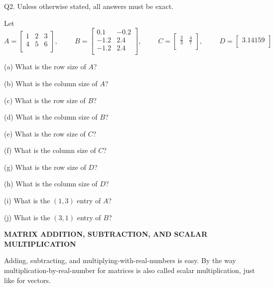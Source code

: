 \newpage

Q2. Unless otherwise stated, all answers must be exact.

Let
\[
A
= 
\begin{bmatrix}
1 & 2 & 3 \\
4 & 5 & 6 \\
\end{bmatrix}
, 
\hspace{1cm}
B
= 
\begin{bmatrix}
0.1 & -0.2 \\
-1.2 & 2.4 \\
-1.2 & 2.4 \\
\end{bmatrix}
, 
\hspace{1cm}
C
= 
\begin{bmatrix}
\frac{2}{3} & \frac{4}{7} \\
\end{bmatrix}
, 
\hspace{1cm}
D
= 
\begin{bmatrix}
3.14159 \\
\end{bmatrix}
\]

(a) What is the row size of $A$?

(b) What is the column size of $A$?

(c) What is the row size of $B$?

(d) What is the column size of $B$?

(e) What is the row size of $C$?

(f) What is the column size of $C$?

(g) What is the row size of $D$?

(h) What is the column size of $D$?

(i) What is the $(1, 3)$ entry of $A$?

(j) What is the $(3, 1)$ entry of $B$?



\newpage
{\bf MATRIX ADDITION, SUBTRACTION, AND SCALAR MULTIPLICATION}

Adding, subtracting, and multiplying-with-real-numbers is easy.
By the way multiplication-by-real-number for matrices
is also called scalar multiplication, just like for vectors.

